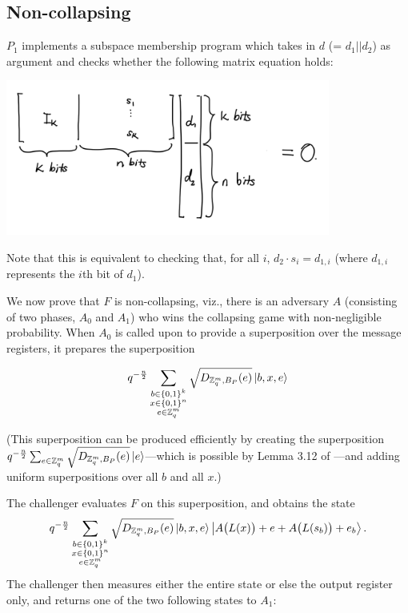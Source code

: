 \documentclass{article}
\begin{document}
\subsection{Non-collapsing}
$P_1$ implements a subspace membership program which takes in $d$ (= $d_1 || d_2$) as argument and checks whether the following matrix equation holds:
\begin{center}
\includegraphics[width=0.8\textwidth]{Diagrams/1.png}
\end{center}

Note that this is equivalent to checking that, for all $i$, $d_2 \cdot s_i = d_{1, i}$ (where $d_{1, i}$ represents the $i$th bit of $d_1$).

We now prove that $F$ is non-collapsing, viz., there is an adversary $A$ (consisting of two phases, $A_0$ and $A_1$) who wins the collapsing game with non-negligible probability. When $A_0$ is called upon to provide a superposition over the message registers, it prepares the superposition

\begin{align}
	q^{-\frac{n}{2}} \sum_{\substack{b \in \{0,1\}^k \\ x \in \{0,1\}^n \\ e \in \mathbb{Z}_q^m}} \sqrt{D_{\mathbb{Z}_q^m, B_P}(e)} \ket{b, x, e}
\end{align}

(This superposition can be produced efficiently by creating the superposition $q^{-\frac{n}{2}} \sum_{e \in \mathbb{Z}_q^m} \sqrt{D_{\mathbb{Z}_q^m, B_P}(e)} \ket{e}$---which is possible by Lemma 3.12 of \cite{reg05}---and adding uniform superpositions over all $b$ and all $x$.)

The challenger evaluates $F$ on this superposition, and obtains the state
\begin{align}
    q^{-\frac{n}{2}} \sum_{\substack{b \in \{0,1\}^k \\ x \in \{0,1\}^n \\ e \in \mathbb{Z}_q^m}} \sqrt{D_{\mathbb{Z}_q^m, B_P}(e)} \ket{b, x, e} \Ket{A\big( L(x) \big) + e + A\big( L(s_b) \big) + e_b}.
\end{align}
The challenger then measures either the entire state or else the output register only, and returns one of the two following states to $A_1$:
\end{document}
